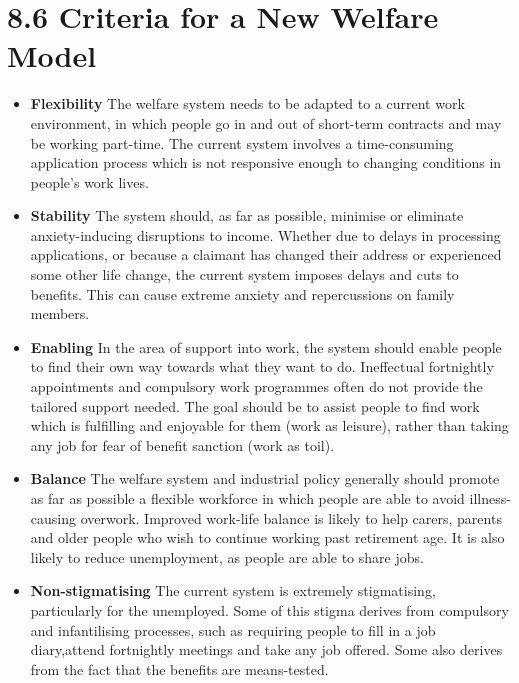 \documentclass[]{tufte-handout}
\providecommand{\tightlist}{%
  \setlength{\itemsep}{0pt}\setlength{\parskip}{0pt}}
\begin{document}
\hypertarget{criteria-for-a-new-welfare-model}{%
\section{8.6 Criteria for a New Welfare
Model}\label{criteria-for-a-new-welfare-model}}

\begin{itemize}
\tightlist
\item
  \textbf{Flexibility} The welfare system needs to be adapted to a
  current work environment, in which people go in and out of short-term
  contracts and may be working part-time. The current system involves a
  time-consuming application process which is not responsive enough to
  changing conditions in people's work lives.\\
\item
  \textbf{Stability} The system should, as far as possible, minimise or
  eliminate anxiety-inducing disruptions to income. Whether due to
  delays in processing applications, or because a claimant has changed
  their address or experienced some other life change, the current
  system imposes delays and cuts to benefits. This can cause extreme
  anxiety and repercussions on family members.
\item
  \textbf{Enabling} In the area of support into work, the system should
  enable people to find their own way towards what they want to do.
  Ineffectual fortnightly appointments and compulsory work programmes
  often do not provide the tailored support needed. The goal should be
  to assist people to find work which is fulfilling and enjoyable for
  them (work as leisure), rather than taking any job for fear of benefit
  sanction (work as toil).
\item
  \textbf{Balance} The welfare system and industrial policy generally
  should promote as far as possible a flexible workforce in which people
  are able to avoid illness-causing overwork. Improved work-life balance
  is likely to help carers, parents and older people who wish to
  continue working past retirement age. It is also likely to reduce
  unemployment, as people are able to share jobs.
\item
  \textbf{Non-stigmatising} The current system is extremely
  stigmatising, particularly for the unemployed. Some of this stigma
  derives from compulsory and infantilising processes, such as requiring
  people to fill in a job diary,attend fortnightly meetings and take any
  job offered. Some also derives from the fact that the benefits are
  means-tested.\\

\end{itemize}
\end{document}
